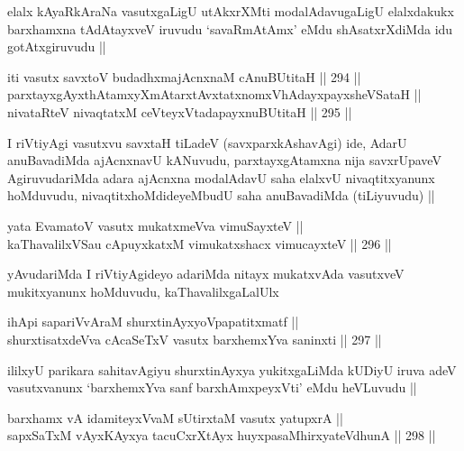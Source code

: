 \begin{artha}
elalx kAyaRkAraNa vasutxgaLigU utAkxrXMti modalAdavugaLigU elalxdakukx
barxhamxna tAdAtayxveV iruvudu `savaRmAtAmx' eMdu shAsatxrXdiMda idu
gotAtxgiruvudu ||
\end{artha}

\begin{shl}
iti vasutx savxtoV budadhxmajAcnxnaM cAnuBUtitaH ||  294 ||  \\
parxtayxgAyxthAtamxyXmAtarxtAvxtatxnomxVhAdayxpayxsheVSataH || \\
nivataRteV nivaqtatxM ceVteyxVtadapayxnuBUtitaH ||  295 ||  
\end{shl}

\begin{artha}
I riVtiyAgi vasutxvu savxtaH tiLadeV (savxparxkAshavAgi) ide, AdarU
anuBavadiMda ajAcnxnavU kANuvudu, parxtayxgAtamxna nija savxrUpaveV
AgiruvudariMda adara ajAcnxna modalAdavU saha elalxvU nivaqtitxyanunx
hoMduvudu, nivaqtitxhoMdideyeMbudU saha anuBavadiMda (tiLiyuvudu) ||
\end{artha}

\begin{shl}
yata EvamatoV vasutx mukatxmeVva vimuSayxteV || \\
kaThavalilxVSau cApuyxkatxM vimukatxshacx vimucayxteV ||  296 ||  
\end{shl}

\begin{artha}
yAvudariMda I riVtiyAgideyo adariMda nitayx mukatxvAda vasutxveV
mukitxyanunx hoMduvudu, kaThavalilxgaLalUlx 
\end{artha}

\begin{shl}
ihApi sapariVvAraM shurxtinAyxyoVpapatitxmatf || \\
shurxtisatxdeVva cA\s \s caSeTxV vasutx barxhemxYva saninxti ||  297 ||  
\end{shl}

\begin{artha}
ililxyU parikara sahitavAgiyu shurxtinAyxya yukitxgaLiMda kUDiyU iruva
adeV vasutxvanunx `barxhemxYva sanf barxhAmxpeyxVti' eMdu heVLuvudu ||
\end{artha}

\begin{shl}
barxhamx vA idamiteyxVvaM sUtirxtaM vasutx yatupxrA || \\
sapxSaTxM vAyxKAyxya tacuCxrXtAyx huyxpasaMhirxyateV\s dhunA ||  298 ||  
\end{shl}

